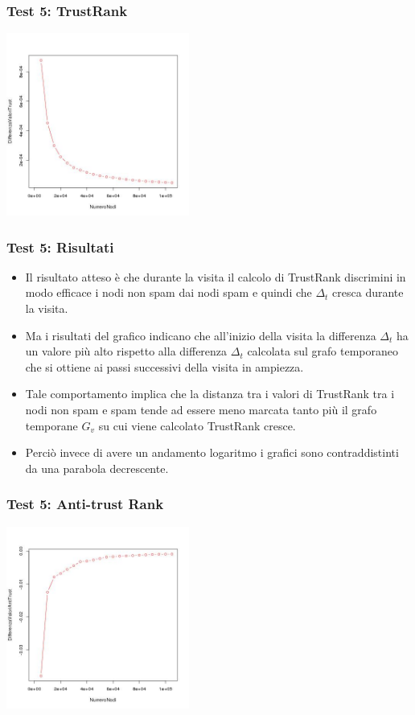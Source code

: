 \documentclass{beamer}
\begin{document}
\begin{frame}
\frametitle{Test 5: TrustRank}
\begin{center}
 \includegraphics[height=6cm]{immagini/test5/averageTest_trust_62}
\end{center}
\end{frame}
\begin{frame}
\frametitle{Test 5: Risultati}
\begin{itemize}
\item<1-> Il risultato atteso è che durante la visita il calcolo di TrustRank discrimini in modo efficace i nodi non spam dai nodi spam e quindi che \(\Delta_t\) cresca durante la visita.
 \item<2-> Ma i risultati del grafico indicano che all'inizio della visita la differenza \(\Delta_t\) ha un valore più alto rispetto alla differenza \(\Delta_t\) calcolata sul grafo temporaneo che si ottiene ai passi successivi della visita in ampiezza.
 \item<3->Tale comportamento implica che la distanza tra i valori di TrustRank tra i nodi non spam e spam tende ad essere meno marcata tanto più il grafo temporane \(G_v\) su cui viene calcolato TrustRank cresce. 
 \item<4-> Perciò invece di avere un andamento logaritmo i grafici sono contraddistinti da una parabola decrescente.
 \end{itemize}
\end{frame}
\begin{frame}
\frametitle{Test 5: Anti-trust Rank}
\begin{center}
 \includegraphics[height=6cm]{immagini/test5/averageTest_antitrust_62}
\end{center}
\end{frame}
\end{document}

